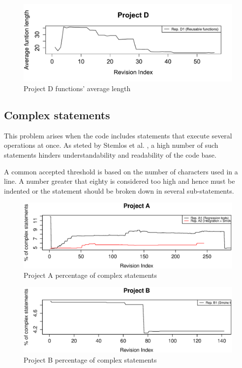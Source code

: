 \begin{figure}[!htbp]
    \centering
    \includegraphics[width=\textwidth]{figure/results/rq1/avg_length_project_d.pdf}
    \caption{Project D  functions' average length}
    \label{fig:avg_length_project_d}
\end{figure}

\FloatBarrier


\subsection{Complex statements}
This problem arises when the code includes statements that execute several operations at once. As steted by Stemlos et al. \cite{metrics_source_code}, a high number of such statements hinders understandability and readability of the code base.

A common accepted threshold is based on the number of characters used in a line. A number greater that eighty is considered too high and hence must be indented or the statement should be broken down in several sub-statements.

\begin{figure}[!htbp]
    \centering
    \includegraphics[width=\textwidth]{figure/results/rq1/statement_complexity_project_a.eps}
    \caption{Project A percentage of complex statements}
    \label{fig:statement_complexity_project_a}
\end{figure}

\begin{figure}[!htbp]
    \centering
    \includegraphics[width=\textwidth]{figure/results/rq1/statement_complexity_project_b.eps}
    \caption{Project B percentage of complex statements}
    \label{fig:statement_complexity_project_b}
\end{figure}

